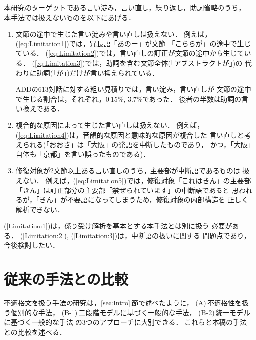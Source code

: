 本研究のターゲットである言い淀み，言い直し，繰り返し，助詞省略のうち，
本手法では扱えないものを以下にあげる．
\begin{enumerate}
\renewcommand{\theenumi}{}
\renewcommand{\labelenumi}{}
  \item\label{Limitation:1}
文節の途中で生じた言い淀みや言い直しは扱えない．
例えば，(\ref{eq:Limitation1})では，冗長語「あのー」が文節
「こちらが」の途中で生じている．
(\ref{eq:Limitation2})では，言い直しの訂正が文節の途中から生じている．
(\ref{eq:Limitation3})では，助詞を含む文節全体(「アブストラクトが」)の
代わりに助詞(「が」)だけが言い換えられている．

ADDの613対話に対する粗い見積りでは，言い淀み，言い直しが
文節の途中で生じる割合は，それぞれ，0.15\%, 3.7\%であった．
後者の半数は助詞の言い換えである．
  \item\label{Limitation:2}
複合的な原因によって生じた言い直しは扱えない．
例えば，(\ref{eq:Limitation4})は，音韻的な原因と意味的な原因が複合した
言い直しと考えられる(「おおさ」は「大阪」の発語を中断したものであり，
かつ，「大阪」自体も「京都」を言い誤ったものである)．
  \item\label{Limitation:3}
修復対象が2文節以上ある言い直しのうち，主要部が中断語であるものは
扱えない．
例えば，(\ref{eq:Limitation5})では，修復対象「これはきん」の主要部
「きん」は訂正部分の主要部「禁ぜられています」の中断語であると
思われるが，「きん」が不要語になってしまうため，修復対象の内部構造を
正しく解析できない．
\end{enumerate}

(\ref{Limitation:1})は，係り受け解析を基本とする本手法とは別に扱う
必要がある．
(\ref{Limitation:2}), (\ref{Limitation:3})は，中断語の扱いに関する
問題点であり，今後検討したい．

\section{従来の手法との比較}\label{sec:Comparison}

不適格文を扱う手法の研究は，\ref{sec:Intro}\,節で述べたように，
(A)\,不適格性を扱う個別的な手法，
(B-1)\,二段階モデルに基づく一般的な手法，
(B-2)\,統一モデルに基づく一般的な手法
の3つのアプローチに大別できる．
これらと本稿の手法との比較を述べる．

